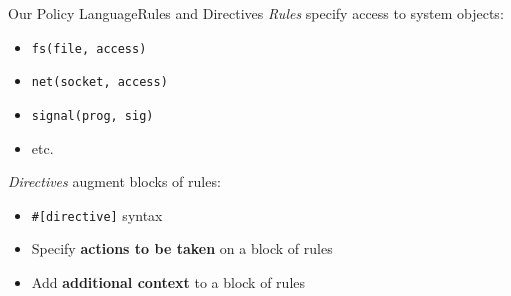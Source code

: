 \documentclass[12pt, dvipsnames, aspectratio=169]{beamer}
\begin{document}

\begin{frame}[c, fragile]{Our Policy Language}{Rules and Directives}
\textit{Rules} specify access to system objects:
\begin{itemize}
    \item \lstinline[language=bpfbox]|fs(file, access)|
    \item \lstinline[language=bpfbox]|net(socket, access)|
    \item \lstinline[language=bpfbox]|signal(prog, sig)|
    \item etc.
\end{itemize}

\vfill
\textit{Directives} augment blocks of rules:
\begin{itemize}
    \item \lstinline[language=bpfbox]|#[directive]| syntax
    \item Specify \textbf{actions to be taken} on a block of rules
    \item Add \textbf{additional context} to a block of rules
\end{itemize}
\end{frame}
\end{document}
